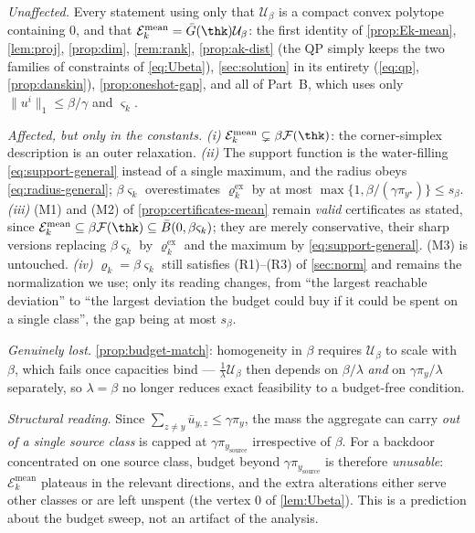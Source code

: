 \begin{remark}
\label{rem:saturated}
\emph{Unaffected.} Every statement using only that $\mathcal{U}_\beta$ is a compact convex polytope
containing $0$, and that $\mathcal{E}_k^{\mathrm{mean}}=\bar G(\thk)\mathcal{U}_\beta$: the first
identity of \cref{prop:Ek-mean}, \cref{lem:proj}, \cref{prop:dim}, \cref{rem:rank},
\cref{prop:ak-dist} (the QP simply keeps the two families of constraints of \cref{eq:Ubeta}),
\cref{sec:solution} in its entirety (\cref{eq:qp}, \cref{prop:danskin}), \cref{prop:oneshot-gap},
and all of Part~B, which uses only $\|u^i\|_1\le\beta/\gamma$ and $\varsigma_k$.

\emph{Affected, but only in the constants.} \emph{(i)} $\mathcal{E}_k^{\mathrm{mean}}\subsetneq
\beta\mathcal{F}(\thk)$: the corner-simplex description is an outer relaxation. \emph{(ii)} The
support function is the water-filling \cref{eq:support-general} instead of a single maximum, and the
radius obeys \cref{eq:radius-general}; $\beta\varsigma_k$ overestimates $\varrho^{\mathrm{ex}}_k$ by
at most $\max\{1,\beta/(\gamma\pi_{y^\star})\}\le s_\beta$. \emph{(iii)} (M1) and (M2) of
\cref{prop:certificates-mean} remain \emph{valid} certificates as stated, since
$\mathcal{E}_k^{\mathrm{mean}}\subseteq\beta\mathcal{F}(\thk)\subseteq\bar B(0,\beta\varsigma_k)$;
they are merely conservative, their sharp versions replacing $\beta\varsigma_k$ by
$\varrho^{\mathrm{ex}}_k$ and the maximum by \cref{eq:support-general}. (M3) is untouched.
\emph{(iv)} $\varrho_k=\beta\varsigma_k$ still satisfies (R1)--(R3) of \cref{sec:norm} and remains
the normalization we use; only its reading changes, from ``the largest reachable deviation'' to
``the largest deviation the budget could buy if it could be spent on a single class'', the gap being
at most $s_\beta$.

\emph{Genuinely lost.} \cref{prop:budget-match}: homogeneity in $\beta$ requires $\mathcal{U}_\beta$
to scale with $\beta$, which fails once capacities bind --- $\tfrac1\lambda\mathcal{U}_\beta$ then
depends on $\beta/\lambda$ \emph{and} on $\gamma\pi_y/\lambda$ separately, so $\lambda=\beta$ no
longer reduces exact feasibility to a budget-free condition.

\emph{Structural reading.} Since $\sum_{z\neq y}\bar u_{y,z}\le\gamma\pi_y$, the mass the aggregate
can carry \emph{out of a single source class} is capped at $\gamma\pi_{y_{\mathrm{source}}}$
irrespective of $\beta$. For a backdoor concentrated on one source class, budget beyond
$\gamma\pi_{y_{\mathrm{source}}}$ is therefore \emph{unusable}: $\mathcal{E}_k^{\mathrm{mean}}$
plateaus in the relevant directions, and the extra alterations either serve other classes or are
left unspent (the vertex $0$ of \cref{lem:Ubeta}). This is a prediction about the budget sweep, not
an artifact of the analysis.
\end{remark}


